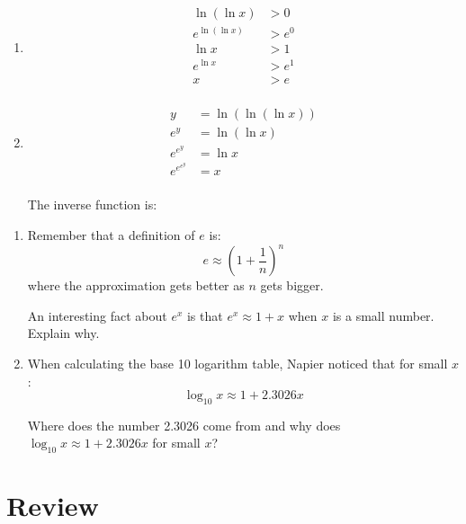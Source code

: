 \documentclass{exam}
\begin{document}
\begin{description}
\begin{enumerate}[a]
          \item 
            \begin{align*}
              \ln(\ln x)     & > 0 \\
              e^{\ln(\ln x)} & > e^0 \\
              \ln x          & > 1 \\
              e^{\ln x}      & > e^1 \\
              x              & > e \\
            \end{align*}


          \item 
            \begin{align*}
              y        &= \ln(\ln(\ln x)) \\
              e^y      &= \ln(\ln x) \\
              e^{e^y}      &= \ln x \\
              e^{e^{e^y}}      &= x \\
            \end{align*}

            The inverse function is: 
        \end{enumerate}
    \end{description}
  \fi

\begin{enumerate}
  \item 
    Remember that a definition of $e$ is:
    \[
      e \approx \left( 1 + \frac{1}{n} \right)^n
    \]
    where the approximation gets better as $n$ gets bigger.

    An interesting fact about $e^x$ is that $e^x \approx 1 + x$ when $x$ is a small number.  Explain why.

  \item 
    When calculating the base 10 logarithm table, Napier noticed that for small $x$:
    \[
      \log_{10} x \approx 1 + 2.3026x
    \]

    Where does the number 2.3026 come from and why does $\log_{10} x \approx 1 + 2.3026x$ for small $x$?
    
\end{enumerate}

  \section{Review}
\end{document}

